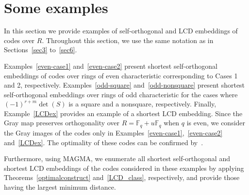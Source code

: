 \documentclass{article}
\theoremstyle{definition}
\theoremstyle{remark}
\begin{document}
\section{Some examples}
In this section we provide examples of self-orthogonal and LCD embeddings of codes over $R$. Throughout this section, we use the same notation as in Sections~\ref{sec3} to~\ref{sec6}.

Examples~\ref{even-case1} and~\ref{even-case2} present shortest self-orthogonal embeddings of codes over rings of even characteristic corresponding to Cases 1 and 2, respectively. Examples~\ref{odd-square} and~\ref{odd-nonsquare} present shortest self-orthogonal embeddings over rings of odd characteristic for the cases where $(-1)^{r+m}\det(S)$ is a square and a nonsquare, respectively. Finally, Example~\ref{LCDex} provides an example of a shortest LCD embedding. Since the Gray map preserves orthogonality over $R=\mathbb{F}_q+u\mathbb{F}_q$ when $q$ is even, we consider the Gray images of the codes only in Examples~\ref{even-case1},~\ref{even-case2} and~\ref{LCDex}. The optimality of these codes can be confirmed by~\cite{Grassl2026}.

Furthermore, using MAGMA, we enumerate all shortest self-orthogonal and shortest LCD embeddings of the codes considered in these examples by applying Theorems~\ref{optimalconstruct} and~\ref{LCD_class}, respectively, and provide those having the largest minimum distance.
\end{document}

